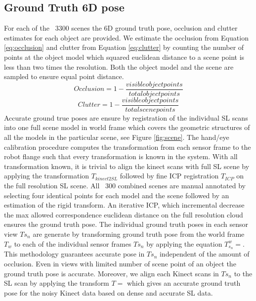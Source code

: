 \documentclass[10pt,twocolumn,letterpaper]{article}
\begin{document}
\subsection{Ground Truth 6D pose}
For each of the ~3300 scenes the 6D ground truth pose, occlusion and clutter estimates for each object are provided. We estimate the occlusion from Equation \ref{eq:occlusion} and clutter from Equation \ref{eq:clutter} by counting the number of points at the object model which squared euclidean distance to a scene point is less than two times the resolution. Both the object model and the scene are sampled to ensure equal point distance.
\begin{equation}
Occlusion = 1 - \frac{visible object points}{total object points} 
\label{eq:occlusion}
\end{equation}
\begin{equation}
Clutter = 1 - \frac{visible object points}{total scene points}
\label{eq:clutter}
\end{equation}
Accurate ground true poses are ensure by registration of the individual SL scans into one full scene model in world frame which covers the geometric structures of all the models in the particular scene, see Figure \ref{fig:scene}. The hand/eye calibration procedure computes the transformation from each sensor frame to the robot flange such that every transformation is known in the system. With all transformation known, it is trivial to align the kinect scans with full SL scene by applying the transformation $T_{kinect2SL}$ followed by fine ICP registration $T_{ICP}$ on the full resolution SL scene. 
All ~300 combined scenes are manual annotated by selecting four identical points for each model and the scene followed by an estimation of the rigid transform. An iterative ICP, which incremental decrease the max allowed correspondence euclidean distance on the full resolution cloud ensures the ground truth pose. The individual ground truth poses in each sensor view $T{s_n}$ are generate by transforming ground truth pose from the world frame $T_{w}$ to each of the individual sensor frames $T{s_n}$ by applying the equation $T^{w}_{s_n} = $. This methodology guarantees accurate pose in $T{s_n}$ independent of the amount of occlusion. Even in views with limited number of scene point of an object the ground truth pose is accurate. Moreover, we align each Kinect scans in $T{s_n}$ to the SL scan by applying the transform $T=$ which gives an accurate ground truth pose for the noisy Kinect data based on dense and accurate SL data. 
\end{document}
